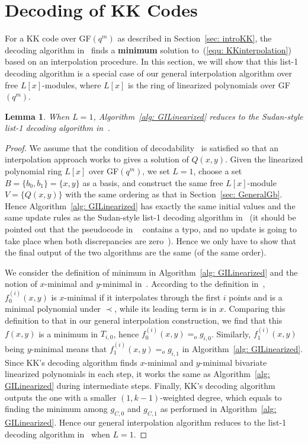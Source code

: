 \documentclass[11pt,onecolumn,draftcls]{IEEEtran}
\newtheorem{lemma}{Lemma}
\begin{document}
\section{Decoding of KK Codes} \label{sec: generalKK}

For a KK code over GF$(q^m)$ as described in Section~\ref{sec: introKK}, the decoding algorithm in~\cite{kotter_it08} finds a \textbf{minimum} solution to~(\ref{equ: KKinterpolation}) based on an interpolation procedure. In this section, we will show that this list-1 decoding algorithm is a special case of our general interpolation algorithm over free $L[x]$-modules, where  $L[x]$ is the ring of linearized polynomials over GF$(q^m)$.



\begin{lemma} \label{lemma: KKspecialcase}
When $L= 1$, Algorithm~\ref{alg: GILinearized} reduces to the Sudan-style list-1 decoding algorithm in~\cite{kotter_it08}.
\end{lemma}
\begin{proof}
We assume that the condition of decodability~\cite{kotter_it08} is satisfied so that an interpolation approach works to gives a solution of $Q(x, y)$. Given the linearized polynomial ring $L[x]$ over GF$(q^m)$, we set $L=1$, choose a set $B = \{ b_0, b_1\} = \{ x, y\}$ as a basis, and construct the same free $L[x]$-module $V = \{Q(x,y) \}$ with the same ordering as that in Section~\ref{sec: GeneralGb}. Hence Algorithm~\ref{alg: GILinearized} has exactly the same initial values and the same update rules as the Sudan-style list-1 decoding algorithm in~\cite{kotter_it08} (it should be pointed out that the pseudocode in ~\cite{kotter_it08} contains a typo, and no update is going to take place when both discrepancies are zero~\cite{kschischang_privatecomm10}). Hence we only have to show that the final output of the two algorithms are the same (of the same order).

We consider the definition of minimum in Algorithm~\ref{alg: GILinearized} and the notion of $x$-minimal and $y$-minimal in~\cite{kotter_it08}. According to the definition in~\cite{kotter_it08}, $f_0^{(i)}(x,y)$ is $x$-minimal if it interpolates through the first $i$ points and is a minimal polynomial under $\prec$, while its leading term is in $x$. Comparing this definition to that in our general interpolation construction, we find that this $f(x,y)$ is a minimum in $T_{i,0}$, hence $f_0^{(i)}(x,y) =_o g_{i,0}$. Similarly, $f_1^{(i)}(x,y)$ being $y$-minimal means that $f_1^{(i)}(x,y) =_o g_{i,1}$ in Algorithm~\ref{alg: GILinearized}. Since KK's decoding algorithm finds $x$-minimal and $y$-minimal bivariate linearized polynomials in each step, it works the same as Algorithm~\ref{alg: GILinearized} during intermediate steps. Finally, KK's decoding algorithm outputs the one with a smaller $(1, k-1)$-weighted degree, which equals to finding the minimum among $g_{C,0}$ and $g_{C,1}$ as performed in Algorithm~\ref{alg: GILinearized}. Hence our general interpolation algorithm reduces to the list-1 decoding algorithm in~\cite{kotter_it08} when $L=1$.
\end{proof}
\end{document}
